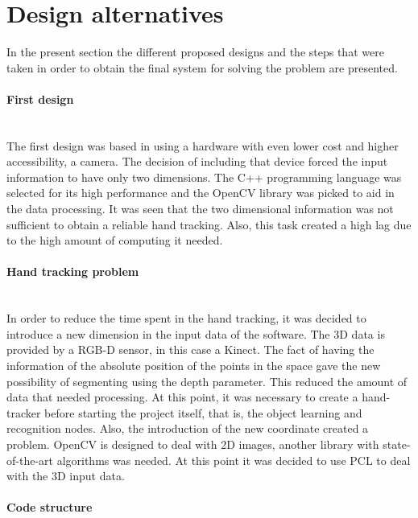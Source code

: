 \section{Design alternatives}
In the present section the different proposed designs and the steps that were taken in order to obtain the final system for solving the problem are presented. 
\\

\paragraph{First design}
\mbox{} \\

The first design was based in using a hardware with even lower cost and higher accessibility, a camera. The decision of including that device forced the input information to have only two dimensions. The C++ programming language was selected for its high performance and the OpenCV library was picked to aid in the data processing. It was seen that the two dimensional information was not sufficient to obtain a reliable hand tracking. Also, this task created a high lag due to the high amount of computing it needed. 
\\


\paragraph{Hand tracking problem}
\mbox{} \\

In order to reduce the time spent in the hand tracking, it was decided to introduce a new dimension in the input data of the software. The 3D data is provided by a RGB-D sensor, in this case a Kinect. The fact of having the information of the absolute position of the points in the space gave the new possibility of segmenting using the depth parameter. This reduced the amount of data that needed processing. At this point, it was necessary to create a hand-tracker before starting the project itself, that is, the object learning and recognition nodes. 
Also, the introduction of the new coordinate created a problem. OpenCV is designed to deal with 2D images, another library with state-of-the-art algorithms was needed. At this point it was decided to use PCL to deal with the 3D input data. 
\\


\paragraph{Code structure}
\mbox{} \\

